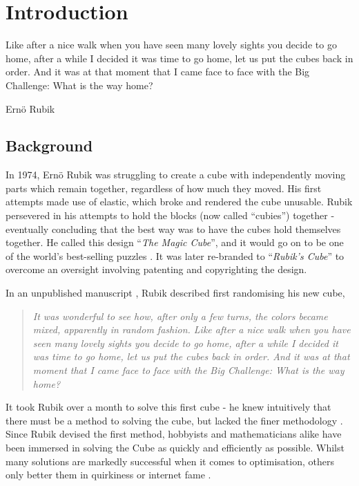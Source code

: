\documentclass{report}
\newcommand{\tit}[1]{\textit{#1}}
\newcommand{\propernoun}[1]{\enquote{\tit{#1}}}
\begin{document}
	\newpage
	\tableofcontents
   	\listoffigures
	\listoftables
	\newpage

	\renewcommand{\thechapter}{\arabic{chapter}}
	\setcounter{chapter}{0}
	\chapter{Introduction}
	\epigraph{Like after a nice walk when you have seen many lovely sights you decide to go home, after a while I decided it was time to go home, let us put the cubes back in order. And it was at that moment that I came face to face with the Big Challenge: What is the way home?}{Ern\"{o} Rubik \cite{Rubik1986}}
	
    \section{Background}

    In 1974, Ern\"{o} Rubik was struggling to create a cube with independently moving parts which remain together, regardless of how much they moved. His first attempts made use of elastic, which broke and rendered the cube unusable. Rubik persevered in his attempts to hold the blocks (now called \enquote{cubies}) together - eventually concluding that the best way was to have the cubes hold themselves together. He called this design \propernoun{The Magic Cube}, and it would go on to be one of the world's best-selling puzzles \cite{Waxman2014}. It was later re-branded to \propernoun{Rubik's Cube} to overcome an oversight involving patenting and copyrighting  the design.
    
    In an unpublished manuscript \cite{Rubik1986}, Rubik described first randomising his new cube, 
    
    \blockquote{\tit{It was wonderful to see how, after only a few turns, the colors became mixed, apparently in random fashion. Like after a nice walk when you have seen many lovely sights you decide to go home, after a while I decided it was time to go home, let us put the cubes back in order. And it was at that moment that I came face to face with the Big Challenge: What is the way home?}}
    
    It took Rubik over a month to solve this first cube - he knew intuitively that there must be a method to solving the cube, but lacked the finer methodology \cite{RubiksCube2017}. Since Rubik devised the first method, hobbyists and mathematicians alike have been immersed in solving the Cube as quickly and efficiently as possible. Whilst many solutions are markedly successful when it comes to optimisation, others only better them in quirkiness or internet fame \cite{Chan2016}.
    
\end{document}
